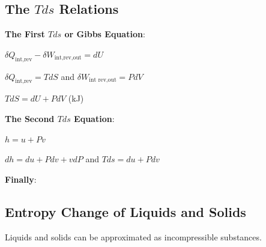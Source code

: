 \documentclass{article}
\begin{document}
\begin{multicols}{3}
    \subsection*{The $Tds$ Relations}
    \textbf{The First $Tds$ or Gibbs Equation}:\par 
    $\delta Q_\text{int,rev}-\delta W_\text{int,rev,out}=dU$\par 
    $\delta Q_\text{int,rev}=TdS$ and $\delta W_\text{int rev,out}=PdV$\par 
    $TdS=dU+PdV$ (kJ)\par 
    \par 
    \textbf{The Second $Tds$ Equation}:\par 
    $h=u+Pv$\par 
    $dh=du+Pdv+vdP$ and $Tds=du+Pdv$\par 
    \par 
    \textbf{Finally}:\par 
    \subsection*{Entropy Change of Liquids and Solids}
    Liquids and solids can be approximated as incompressible substances.\par 



\end{multicols}  
\end{document}
